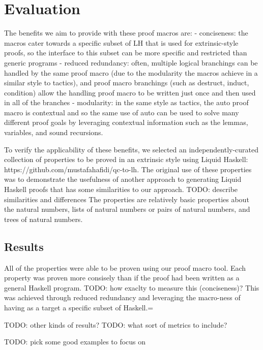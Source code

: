\section{Evaluation}

The benefits we aim to provide with these proof macros are:
- conciseness: the macros cater towards a specific subset of LH that is used for extrinsic-style proofs, so the interface to this subset can be more specific and restricted than generic programs
- reduced redundancy: often, multiple logical branchings can be handled by the same proof macro (due to the modularity the macros achieve in a similar style to tactics), and proof macro branchings (such as destruct, induct, condition) allow the handling proof macro to be written just once and then used in all of the branches
- modularity: in the same style as tactics, the auto proof macro is contextual and so the same use of auto can be used to solve many different proof goals by leveraging contextual information such as the lemmas, variables, and sound recursions.

To verify the applicability of these benefits, we selected an independently-curated collection of properties to be proved in an extrinsic style using Liquid Haskell: https://github.com/mustafahafidi/qc-to-lh. The original use of these properties was to demonstrate the usefulness of another approach to generating Liquid Haskell proofs that has some similarities to our approach.
TODO: describe similarities and differences
The properties are relatively basic properties about the natural numbers, lists of natural numbers or pairs of natural numbers, and trees of natural numbers.


\subsection{Results}

All of the properties were able to be proven using our proof macro tool.
Each property was proven more consisely than if the proof had been written as a general Haskell program.
TODO: how exaclty to measure this (conciseness)?
This was achieved through reduced redundancy and leveraging the macro-ness of having as a target a specific subset of Haskell.=

TODO: other kinds of results?
TODO: what sort of metrics to include?

TODO: pick some good examples to focus on
